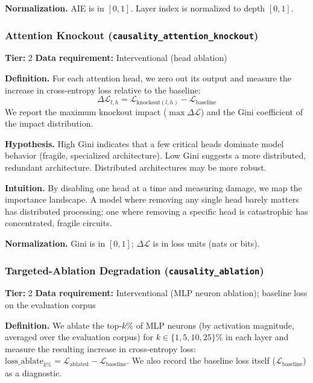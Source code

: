 \documentclass[preprint]{neurips_2025}
\begin{document}
\textbf{Normalization.} AIE is in $[0, 1]$. Layer index is normalized to depth $[0, 1]$.

\subsubsection{Attention Knockout (\texttt{causality\_attention\_knockout})}
\label{app:knockout}

\textbf{Tier:} 2 \quad \textbf{Data requirement:} Interventional (head ablation)

\textbf{Definition.}
For each attention head, we zero out its output and measure the increase in cross-entropy loss relative to the baseline:
\begin{equation}
  \Delta\mathcal{L}_{l,h} = \mathcal{L}_{\text{knockout}(l,h)} - \mathcal{L}_{\text{baseline}}
\end{equation}
We report the maximum knockout impact ($\max \Delta\mathcal{L}$) and the Gini coefficient of the impact distribution.

\textbf{Hypothesis.}
High Gini indicates that a few critical heads dominate model behavior (fragile, specialized architecture). Low Gini suggests a more distributed, redundant architecture. Distributed architectures may be more robust.

\textbf{Intuition.}
By disabling one head at a time and measuring damage, we map the importance landscape. A model where removing any single head barely matters has distributed processing; one where removing a specific head is catastrophic has concentrated, fragile circuits.

\textbf{Normalization.} Gini is in $[0, 1]$; $\Delta\mathcal{L}$ is in loss units (nats or bits).

\subsubsection{Targeted-Ablation Degradation (\texttt{causality\_ablation})}
\label{app:ablation}

\textbf{Tier:} 2 \quad \textbf{Data requirement:} Interventional (MLP neuron ablation); baseline loss on the evaluation corpus

\textbf{Definition.} We ablate the top-$k\%$ of MLP neurons (by activation magnitude, averaged over the evaluation corpus) for $k \in \{1, 5, 10, 25\}\%$ in each layer and measure the resulting increase in cross-entropy loss: $\text{loss\_ablate}_{k\%} = \mathcal{L}_{\text{ablated}} - \mathcal{L}_{\text{baseline}}$. We also record the baseline loss itself ($\mathcal{L}_{\text{baseline}}$) as a diagnostic.
\end{document}
